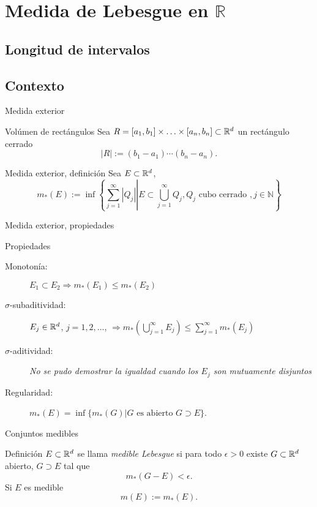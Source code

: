 \chapter{Medida de Lebesgue en $\mathbb{R}$}

\section{Longitud de intervalos}





\section{Contexto}

Medida exterior


{Volúmen de rectángulos}
  Sea $R=[a_1,b_1]\times\ldots\times [a_n,b_n]\subset\mathbb{R}^d$ un rectángulo cerrado
  \[|R|:=(b_1-a_1)\cdots(b_n-a_n).\]


{Medida exterior, definición}
  Sea $E\subset\mathbb{R}^d$,
  \[\boxed{m_*(E):=\inf\left\{\sum_{j=1}^{\infty}|Q_j|\left| E\subset\bigcup_{j=1}^{\infty}Q_j, Q_j\text{ cubo cerrado }, j\in\mathbb{N}\right.\right\}}\]   

		


Medida exterior, propiedades

{Propiedades}
  \begin{description}
   \item[Monotonía:] $E_1\subset E_2\Rightarrow m_*(E_1)\leq m_*(E_2)$ 
   \item[$\sigma$-subaditividad:] $E_j\in\mathbb{R}^d$, $j=1,2,\ldots$, $\Rightarrow \boxed{ m_*\left(\bigcup_{j=1}^{\infty}E_j\right)\leq\sum_{j=1}^{\infty}m_*(E_j)}$
   \item[$\sigma$-aditividad:] \emph{No se pudo demostrar la igualdad cuando los $E_j$ son mutuamente disjuntos}  
   \item[Regularidad:] $m_*(E)=\inf\{m_*(G)|G\text{ es abierto } G\supset E\}$.
  \end{description}




		



Conjuntos medibles

{Definición}
  $E\subset\mathbb{R}^d$ se llama \emph{medible Lebesgue} si para todo $\epsilon>0$ existe $G\subset\mathbb{R}^d$ abierto, $G\supset E$ tal que
  \[\boxed{m_*(G-E)<\epsilon}.\]
  Si $E$ es medible
  \[m(E):=m_*(E).\]



